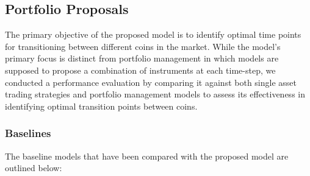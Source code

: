 
\subsection{Portfolio Proposals}
The primary objective of the proposed model is to identify optimal time points for transitioning between different coins in the market. While the model's primary focus is distinct from portfolio management in which models are supposed to propose a combination of instruments at each time-step, we conducted a performance evaluation by comparing it against both single asset trading strategies and portfolio management models to assess its effectiveness in identifying optimal transition points between coins.

\subsubsection{Baselines}
The baseline models that have been compared with the proposed model are outlined below:

